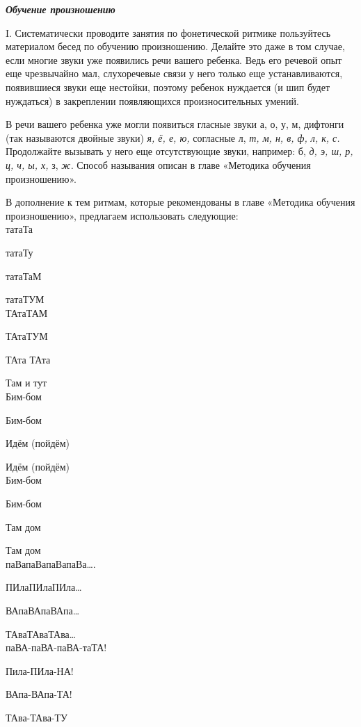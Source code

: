 \documentclass{book}
\renewcommand{\emph}[1]{\textit{#1}}
\begin{document}
\emph{\textbf{Обучение произношению}}

I. Систематически проводите занятия по фонетической ритмике пользуйтесь
материалом бесед по обучению произношению. Делайте это даже в том
случае, если многие звуки уже появились речи вашего ребенка. Ведь его
речевой опыт еще чрезвычайно мал, слухоречевые связи у него только еще
устанавливаются, появившиеся звуки еще нестойки, поэтому ребенок
нуждается (и шип будет нуждаться) в закреплении появляющихся
произносительных умений.

В речи вашего ребенка уже могли появиться гласные звуки а, о, у, м,
дифтонги (так называются двойные звуки) \emph{я, ё, е, ю,} согласные л,
\emph{т, м, н, в, ф, л, к, с.} Продолжайте вызывать у него еще
отсутствующие звуки, например: б, \emph{д, э, ш, р, ц, ч, ы, х,} з,
\emph{ж.} Способ называния описан в главе «Методика обучения
произношению».

В дополнение к тем ритмам, которые рекомендованы в главе «Методика
обучения произношению», предлагаем использовать следующие: \\


татаТа

татаТу

татаТаМ

татаТУМ \\

ТАтаТАМ

ТАтаТУМ

ТАта ТАта

Там и тут \\

Бим-бом

Бим-бом

Идём (пойдём)

Идём (пойдём) \\

Бим-бом

Бим-бом

Там дом

Там дом \\

паВапаВапаВапаВа\ldots.

ПИлаПИлаПИла\ldots{}

ВАпаВАпаВАпа\ldots{}

ТАваТАваТАва\ldots{} \\

паВА-паВА-паВА-таТА!

Пила-ПИла-НА!

ВАпа-ВАпа-ТА!

ТАва-ТАва-ТУ \\
\end{document}

